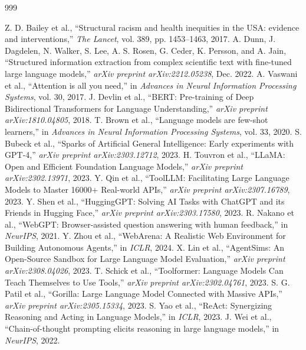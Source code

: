 \documentclass[12pt,oneside]{report}
\begin{document}
\newpage
{}
\begin{thebibliography}{999}

 Z. D. Bailey et al., ``Structural racism and health inequities in the USA: evidence and interventions,'' \textit{The Lancet}, vol. 389, pp. 1453--1463, 2017.
 A. Dunn, J. Dagdelen, N. Walker, S. Lee, A. S. Rosen, G. Ceder, K. Persson, and A. Jain, ``Structured information extraction from complex scientific text with fine-tuned large language models,'' \textit{arXiv preprint arXiv:2212.05238}, Dec. 2022.
 A. Vaswani et al., ``Attention is all you need,'' in \textit{Advances in Neural Information Processing Systems}, vol. 30, 2017.
 J. Devlin et al., ``BERT: Pre-training of Deep Bidirectional Transformers for Language Understanding,'' \textit{arXiv preprint arXiv:1810.04805}, 2018.
 T. Brown et al., ``Language models are few-shot learners,'' in \textit{Advances in Neural Information Processing Systems}, vol. 33, 2020.
 S. Bubeck et al., ``Sparks of Artificial General Intelligence: Early experiments with GPT-4,'' \textit{arXiv preprint arXiv:2303.12712}, 2023.
 H. Touvron et al., ``LLaMA: Open and Efficient Foundation Language Models,'' \textit{arXiv preprint arXiv:2302.13971}, 2023.
 Y. Qin et al., ``ToolLLM: Facilitating Large Language Models to Master 16000+ Real-world APIs,'' \textit{arXiv preprint arXiv:2307.16789}, 2023.
 Y. Shen et al., ``HuggingGPT: Solving AI Tasks with ChatGPT and its Friends in Hugging Face,'' \textit{arXiv preprint arXiv:2303.17580}, 2023.
 R. Nakano et al., ``WebGPT: Browser-assisted question answering with human feedback,'' in \textit{NeurIPS}, 2021.
 Y. Zhou et al., ``WebArena: A Realistic Web Environment for Building Autonomous Agents,'' in \textit{ICLR}, 2024.
 X. Lin et al., ``AgentSims: An Open-Source Sandbox for Large Language Model Evaluation,'' \textit{arXiv preprint arXiv:2308.04026}, 2023.
 T. Schick et al., ``Toolformer: Language Models Can Teach Themselves to Use Tools,'' \textit{arXiv preprint arXiv:2302.04761}, 2023.
 S. G. Patil et al., ``Gorilla: Large Language Model Connected with Massive APIs,'' \textit{arXiv preprint arXiv:2305.15334}, 2023.
 S. Yao et al., ``ReAct: Synergizing Reasoning and Acting in Language Models,'' in \textit{ICLR}, 2023.
 J. Wei et al., ``Chain-of-thought prompting elicits reasoning in large language models,'' in \textit{NeurIPS}, 2022.

\end{thebibliography}
\end{document}
